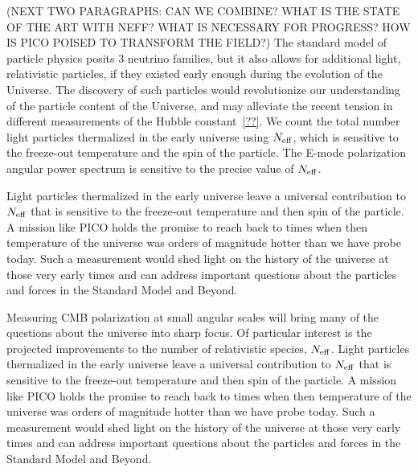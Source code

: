 \documentclass[PICOReport.tex]{subfiles}
\begin{document}
(NEXT TWO PARAGRAPHS: CAN WE COMBINE? WHAT IS THE STATE OF THE ART WITH NEFF? WHAT 
IS NECESSARY FOR PROGRESS? HOW IS PICO POISED TO TRANSFORM THE FIELD?)
The standard model of particle physics posits 3 neutrino families, but it also allows for additional light, relativistic particles, if 
they existed early enough during the evolution of the Universe. The discovery of such particles would revolutionize 
our understanding of the particle content of the Universe, 
and may alleviate the recent tension in different measurements of the Hubble constant~\ref{??}.  We count the total number 
light particles thermalized in the early universe using ${N_{\rm eff}}$, which is sensitive to the freeze-out temperature and 
the spin of the particle. The E-mode polarization angular power spectrum is sensitive to the precise value of ${N_{\rm eff}}$.  

Light particles thermalized in the early universe leave a universal contribution to ${N_{\rm eff}}$ that is sensitive to the 
freeze-out temperature and then spin of the particle.  A mission like PICO holds the promise to reach 
back to times when then temperature of the universe was orders of magnitude hotter than we have probe today.  
Such a measurement would shed light on the history of the universe at those very early times and can address 
important questions about the particles and forces in the Standard Model and Beyond.



Measuring CMB polarization at small angular scales will bring many of the questions about the universe into sharp focus.  Of particular interest is the projected improvements to the number of relativistic species, ${N_{\rm eff}}$.  Light particles thermalized in the early universe leave a universal contribution to ${N_{\rm eff}}$ that is sensitive to the freeze-out temperature and then spin of the particle.  A mission like PICO holds the promise to reach back to times when then temperature of the universe was orders of magnitude hotter than we have probe today.  Such a measurement would shed light on the history of the universe at those very early times and can address important questions about the particles and forces in the Standard Model and Beyond. 
\end{document}
